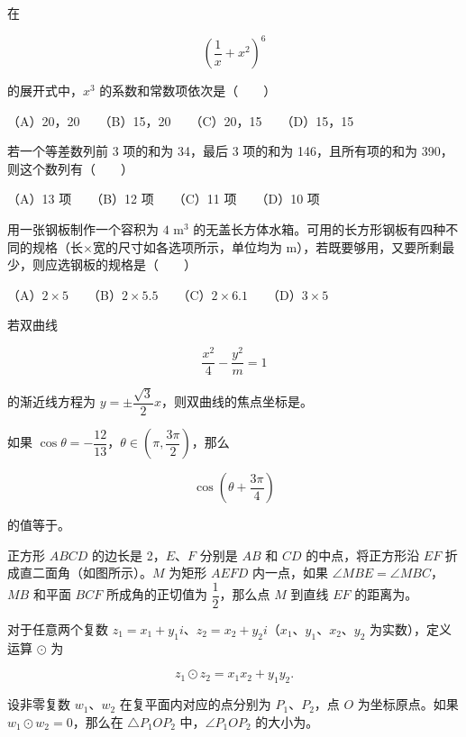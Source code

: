 \begin{question}
在

\nopagebreak[4]
\[
\left(\frac1x+x^2\right)^6
\]

的展开式中，$x^3$ 的系数和常数项依次是\mbox{（　　）}

（A）20，20　　（B）15，20　　（C）20，15　　（D）15，15

\end{question}
\begin{question}
若一个等差数列前 3 项的和为 34，最后 3 项的和为 146，且所有项的和为 390，则这个数列有\mbox{（　　）}

（A）13 项　　（B）12 项　　（C）11 项　　（D）10 项

\end{question}
\begin{question}
用一张钢板制作一个容积为 $4\text{ m}^3$ 的无盖长方体水箱。可用的长方形钢板有四种不同的规格（长$\times$宽的尺寸如各选项所示，单位均为 m），若既要够用，又要所剩最少，则应选钢板的规格是\mbox{（　　）}

（A）$2\times5$　　（B）$2\times5.5$　　（C）$2\times6.1$　　（D）$3\times5$

\end{question}

\begin{question}
若双曲线

\nopagebreak[4]
\[
\frac{x^2}{4}-\frac{y^2}{m}=1
\]

的渐近线方程为 $y=\pm\dfrac{\sqrt3}{2}x$，则双曲线的焦点坐标是\gkblank{}。

\end{question}
\begin{question}
如果 $\cos\theta=-\dfrac{12}{13}$，$\theta\in\left(\pi,\dfrac{3\pi}{2}\right)$，那么

\nopagebreak[4]
\[
\cos\left(\theta+\frac{3\pi}{4}\right)
\]

的值等于\gkblank{}。

\Needspace{0.4\textheight}
\end{question}
\begin{question}
正方形 $ABCD$ 的边长是 2，$E\text{、}F$ 分别是 $AB$ 和 $CD$ 的中点，将正方形沿 $EF$ 折成直二面角（如图所示）。$M$ 为矩形 $AEFD$ 内一点，如果 $\angle MBE=\angle MBC$，$MB$ 和平面 $BCF$ 所成角的正切值为 $\dfrac12$，那么点 $M$ 到直线 $EF$ 的距离为\gkblank{}。
\nopagebreak[4]
\begin{center}\end{center}
\nopagebreak[4]
\end{question}
\begin{question}
对于任意两个复数 $z_1=x_1+y_1i$、$z_2=x_2+y_2i$（$x_1\text{、}y_1\text{、}x_2\text{、}y_2$ 为实数），定义运算 $\odot$ 为

\nopagebreak[4]
\[
z_1\odot z_2=x_1x_2+y_1y_2.
\]

设非零复数 $w_1\text{、}w_2$ 在复平面内对应的点分别为 $P_1\text{、}P_2$，点 $O$ 为坐标原点。如果 $w_1\odot w_2=0$，那么在 $\triangle P_1OP_2$ 中，$\angle P_1OP_2$ 的大小为\gkblank{}。

\end{question}

